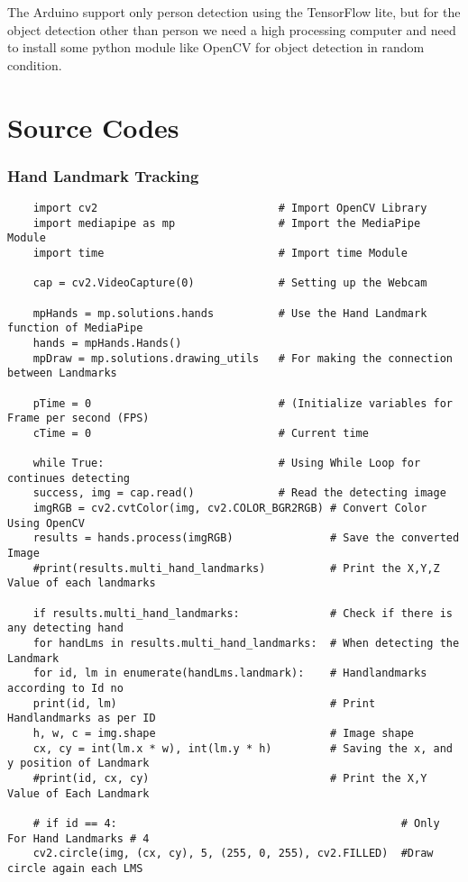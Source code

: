 The Arduino support only person detection using the TensorFlow lite, but for the object detection other than person we need a high processing computer and need to install some python module like OpenCV for object detection in random condition.



\chapter{Source Codes}

\subsection{Hand Landmark Tracking}
\begin{verbatim}
	import cv2                            # Import OpenCV Library
	import mediapipe as mp                # Import the MediaPipe Module
	import time                           # Import time Module
	
	cap = cv2.VideoCapture(0)             # Setting up the Webcam
	
	mpHands = mp.solutions.hands          # Use the Hand Landmark function of MediaPipe
	hands = mpHands.Hands()
	mpDraw = mp.solutions.drawing_utils   # For making the connection between Landmarks
	
	pTime = 0                             # (Initialize variables for Frame per second (FPS)
	cTime = 0                             # Current time
	
	while True:                           # Using While Loop for continues detecting 
	success, img = cap.read()             # Read the detecting image
	imgRGB = cv2.cvtColor(img, cv2.COLOR_BGR2RGB) # Convert Color Using OpenCV
	results = hands.process(imgRGB)               # Save the converted Image
	#print(results.multi_hand_landmarks)          # Print the X,Y,Z Value of each landmarks
	
	if results.multi_hand_landmarks:              # Check if there is any detecting hand
	for handLms in results.multi_hand_landmarks:  # When detecting the Landmark
	for id, lm in enumerate(handLms.landmark):    # Handlandmarks according to Id no
	print(id, lm)                                 # Print Handlandmarks as per ID
	h, w, c = img.shape                           # Image shape
	cx, cy = int(lm.x * w), int(lm.y * h)         # Saving the x, and y position of Landmark
	#print(id, cx, cy)                            # Print the X,Y Value of Each Landmark
	
	# if id == 4:                                            # Only For Hand Landmarks # 4 
	cv2.circle(img, (cx, cy), 5, (255, 0, 255), cv2.FILLED)  #Draw circle again each LMS 
	

\end{verbatim}
